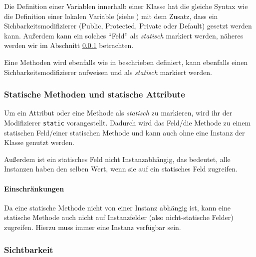 	Die Definition einer Variablen innerhalb einer Klasse hat die gleiche Syntax wie die Definition einer lokalen Variable (siehe ) mit dem Zusatz, dass ein Sichbarkeitsmodifizierer (Public, Protected, Private oder Default) gesetzt werden kann. Außerdem kann ein solches \enquote{Feld} als \textit{statisch} markiert werden, näheres werden wir im Abschnitt \ref{sec:static_fields} betrachten.
	
	Eine Methoden wird ebenfalls wie in  beschrieben definiert, kann ebenfalls einen Sichbarkeitsmodifizierer aufweisen und als \textit{statisch} markiert werden.
	
	\subsubsection{Statische Methoden und statische Attribute}
		\label{sec:static_fields}
		
		Um ein Attribut oder eine Methode als \textit{statisch} zu markieren, wird ihr der Modifizierer \lstinline|static| vorangestellt. Dadurch wird das Feld/die Methode zu einem statischen Feld/einer statischen Methode und kann auch ohne eine Instanz der Klasse genutzt werden.
		
		Außerdem ist ein statisches Feld nicht Instanzabhängig, das bedeutet, alle Instanzen haben den selben Wert, wenn sie auf ein statisches Feld zugreifen.
		
		\paragraph{Einschränkungen}
			Da eine statische Methode nicht von einer Instanz abhängig ist, kann eine statische Methode auch nicht auf Instanzfelder (also nicht-statische Felder) zugreifen. Hierzu muss immer eine Instanz verfügbar sein.
	
	\subsubsection{Sichtbarkeit}
		\label{sec:visibility}
	

